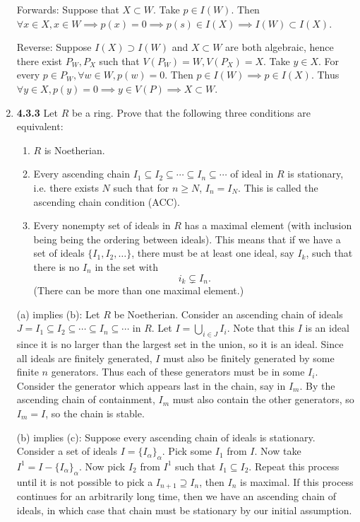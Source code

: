 \documentclass[12pt]{article}
\begin{document}
\begin{enumerate}
        Forwards: Suppose that $X\subset W$.  Take $p\in I(W)$.  Then $\forall x\in X, x\in W \implies p(x)=0 \implies p(s)\in I(X) \implies I(W)\subset I(X)$.
        
        Reverse: Suppose $I(X)\supset I(W)$ and $X \subset W$ are both algebraic, hence there exist $P_W, P_X$ such that $V(P_W)=W, V(P_X)=X$.  Take $y\in X$.  For every $p\in P_W, \forall w\in W, p(w)=0$.  Then $p\in I(W) \implies p\in I(X)$.  Thus $\forall y\in X, p(y)=0 \implies y\in V(P) \implies X\subset W$.
     
    \item \textbf{4.3.3} Let $R$ be a ring.  Prove that the following three conditions are equivalent:
    \begin{enumerate}
    \item $R$ is Noetherian.
    
    \item Every ascending chain $I_1 \subseteq I_2 \subseteq \cdots \subseteq I_n \subseteq \cdots$ of ideal in $R$ is stationary, i.e. there exists $N$ such that for $n\geq N$, $I_n=I_N$.  This is called the ascending chain condition (ACC).
    
    \item Every nonempty set of ideals in $R$ has a maximal element (with inclusion being being the ordering between ideals).  This means that if we have a set of ideals $\{I_1,I_2,\dots\}$, there must be at least one ideal, say $I_k$, such that there is no $I_n$ in the set with 
    \[i_k \subsetneq I_n.\]
    (There can be more than one maximal element.)
    \end{enumerate}
    
    (a) implies (b): Let $R$ be Noetherian.  Consider an ascending chain of ideals $J = I_1 \subseteq I_2 \subseteq \cdots \subseteq I_n \subseteq \cdots$ in $R$.  Let $I = \bigcup_{i\in J} I_i$.  Note that this $I$ is an ideal since it is no larger than the largest set in the union, so it is an ideal.  Since all ideals are finitely generated, $I$ must also be finitely generated by some finite $n$ generators.  Thus each of these generators must be in some $I_i$.  Consider the generator which appears last in the chain, say in $I_m$.  By the ascending chain of containment, $I_m$ must also contain the other generators, so $I_m=I$, so the chain is stable.
        
    (b) implies (c): Suppose every ascending chain of ideals is stationary.  Consider a set of ideals $I=\{I_\alpha\}_\alpha$.  Pick some $I_1$ from $I$.  Now take $I^1= I- \{I_\alpha\}_\alpha$.  Now pick $I_2$ from $I^1$ such that $I_1\subseteq I_2$.  Repeat this process until it is not possible to pick a $I_{n+1} \supseteq I_n$, then $I_n$ is maximal.  If this process continues for an arbitrarily long time, then we have an ascending chain of ideals, in which case that chain must be stationary by our initial assumption.
    

\end{enumerate}
\end{document}
